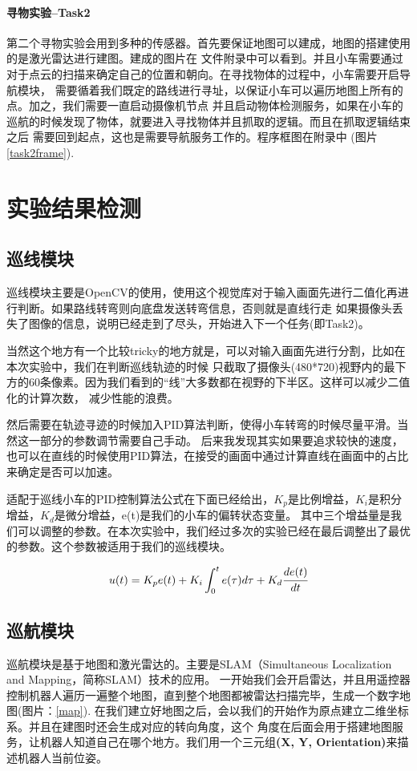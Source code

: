 \documentclass[a4paper,twoside]{article}
\begin{document}
\paragraph*{寻物实验--Task2}
第二个寻物实验会用到多种的传感器。首先要保证地图可以建成，地图的搭建使用的是激光雷达进行建图。建成的图片在
文件附录中可以看到。并且小车需要通过对于点云的扫描来确定自己的位置和朝向。在寻找物体的过程中，小车需要开启导航模块，
需要循着我们既定的路线进行寻址，以保证小车可以遍历地图上所有的点。加之，我们需要一直启动摄像机节点
并且启动物体检测服务，如果在小车的巡航的时候发现了物体，就要进入寻找物体并且抓取的逻辑。而且在抓取逻辑结束之后
需要回到起点，这也是需要导航服务工作的。程序框图在附录中 (图片\ref*{task2frame}).


\newpage
\section{实验结果检测}

\subsection{巡线模块}
巡线模块主要是OpenCV的使用，使用这个视觉库对于输入画面先进行二值化再进行判断。如果路线转弯则向底盘发送转弯信息，否则就是直线行走
如果摄像头丢失了图像的信息，说明已经走到了尽头，开始进入下一个任务(即Task2)。

当然这个地方有一个比较tricky的地方就是，可以对输入画面先进行分割，比如在本次实验中，我们在判断巡线轨迹的时候
只截取了摄像头(480*720)视野内的最下方的60条像素。因为我们看到的“线”大多数都在视野的下半区。这样可以减少二值化的计算次数，
减少性能的浪费。

然后需要在轨迹寻迹的时候加入PID算法判断，使得小车转弯的时候尽量平滑。当然这一部分的参数调节需要自己手动。
后来我发现其实如果要追求较快的速度，也可以在直线的时候使用PID算法，在接受的画面中通过计算直线在画面中的占比
来确定是否可以加速。

适配于巡线小车的PID控制算法公式在下面已经给出，$K_p$是比例增益，$K_i$是积分增益，$K_d$是微分增益，e(t)是我们的小车的偏转状态变量。
其中三个增益量是我们可以调整的参数。在本次实验中，我们经过多次的实验已经在最后调整出了最优的参数。这个参数被适用于我们的巡线模块。

\begin{equation}
	u(t) = K_pe(t)+K_i\int_0^te(\tau)d\tau+K_d\cfrac{de(t)}{dt}
\end{equation}

\subsection{巡航模块}
巡航模块是基于地图和激光雷达的。主要是SLAM（Simultaneous Localization and Mapping，简称SLAM）技术的应用。
一开始我们会开启雷达，并且用遥控器控制机器人遍历一遍整个地图，直到整个地图都被雷达扫描完毕，生成一个数字地图(图片：\ref*{map}).
在我们建立好地图之后，会以我们的开始作为原点建立二维坐标系。并且在建图时还会生成对应的转向角度，这个
角度在后面会用于搭建地图服务，让机器人知道自己在哪个地方。我们用一个三元组\textbf{(X, Y, Orientation)}来描述机器人当前位姿。
\end{document}
